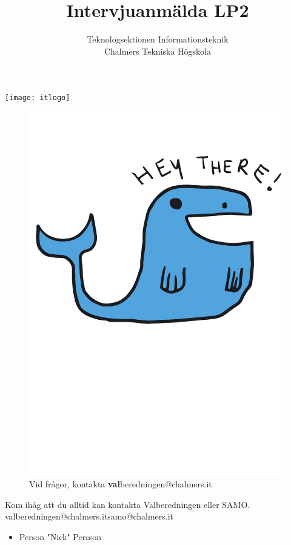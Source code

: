 \documentclass[11pt, noincludeaddress, nopagination]{classes/cthit}
\begin{document}
\thispagestyle{empty}

\title{Intervjuanmälda LP2 \the\year}
\subtitle{ \large Teknologsektionen Informationsteknik \\ Chalmers Tekniska Högskola}

\begin{center}
\texttt{[image: itlogo]}
\end{center}

\makeheadfoot%

\makesimpletitle
\vspace{1cm}

\newpage
\thispagestyle{empty}

\begin{figure}[h]
    \centering
    \includegraphics[width=\textwidth, angle=2]{whale}
    Vid frågor, kontakta \textbf{val}beredningen@chalmers.it
\end{figure}

\clearpage

\begin{center}
    Kom ihåg att du alltid kan kontakta Valberedningen eller SAMO.\\
    valberedningen@chalmers.it\hspace{25pt}samo@chalmers.it
\end{center}

\begin{itemize}
   \item Person "Nick" Persson
\end{itemize}
\end{document}

